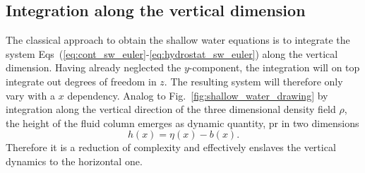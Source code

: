 \subsection{Integration along the vertical dimension}
\label{subsec:int_sw}
The classical approach to obtain the shallow water equations is to integrate the system Eqs~(\ref{eq:cont_sw_euler}-\ref{eq:hydrostat_sw_euler}) along the vertical dimension.
Having already neglected the $y$-component, the integration will on top integrate out degrees of freedom in $z$.
The resulting system will therefore only vary with a $x$ dependency.
Analog to Fig.~\ref{fig:shallow_water_drawing} by integration along the vertical direction of the three dimensional density field $\rho$, the height of the fluid column emerges as dynamic quantity, pr in two dimensions
\begin{equation}\label{eq:shallow_water_height}
    h(x) = \eta(x) - b(x).    
\end{equation}
Therefore it is a reduction of complexity and effectively enslaves the vertical dynamics to the horizontal one.

